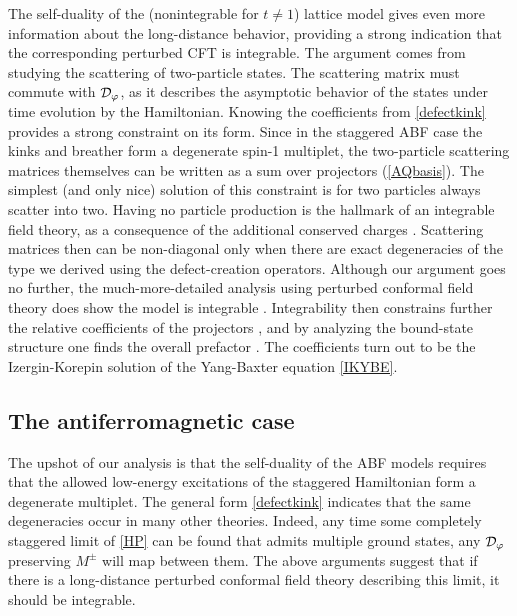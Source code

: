 The self-duality of the (nonintegrable for $t\ne 1$) lattice model gives even more information about the long-distance behavior, providing a strong indication that the corresponding perturbed CFT is integrable. The argument comes from studying the scattering of two-particle states. The scattering matrix must commute with $\mathcal{D}_\varphi$, as it describes the asymptotic behavior of the states under time evolution by the Hamiltonian. Knowing the coefficients from \eqref{defectkink} provides a strong constraint on its form. Since in the staggered ABF case the kinks and breather form a degenerate spin-1 multiplet, the two-particle scattering matrices themselves can be written as a sum over projectors (\ref{AQbasis}). The simplest (and only nice) solution of this constraint is for two particles always scatter into two. Having no particle production is the hallmark of an integrable field theory, as a consequence of the additional conserved charges \cite{ZamZam}. Scattering matrices then can be non-diagonal only when there are exact degeneracies of the type we derived using the defect-creation operators. Although our argument goes no further, the much-more-detailed analysis using perturbed conformal field theory does show the model is integrable \cite{Smirnov1991,Chim1991}. Integrability then constrains further the relative coefficients of the projectors  \cite{Smirnov1991,Chim1991,Fendley2002}, and by analyzing the bound-state structure one finds the overall prefactor  \cite{Dorey2002a,Dorey2002b}. The coefficients turn out to be the Izergin-Korepin solution of the Yang-Baxter equation \eqref{IKYBE}.


\subsection{The antiferromagnetic case}
\label{sec:AFM}

The upshot of our analysis is that the self-duality of the ABF models requires that the allowed low-energy {excitations} of the staggered Hamiltonian form a degenerate multiplet. The general form \eqref{defectkink} indicates that the same degeneracies occur in many other theories.  Indeed, any time some completely staggered limit of \eqref{HP} can be found that admits multiple ground states, any $\mathcal{D}_\varphi$ preserving $M^\pm$ will map between them. The above arguments suggest that if there is a long-distance perturbed conformal field theory describing this limit, it should be integrable. 

